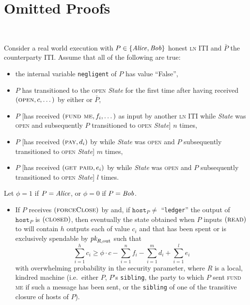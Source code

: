 \section{Omitted Proofs} \ \\
\label{sec:proofs}

\begin{lemma}
\label{lemma:real-balance-security}
  Consider a real world execution with $P \in \{\mathit{Alice}, \mathit{Bob}\}$ honest
  \textsc{ln} ITI and $\bar{P}$ the counterparty ITI. Assume that all of the
  following are true:
  \begin{itemize}
    \item the internal variable \texttt{negligent} of $P$ has value ``False'',
    \item $P$ has transitioned to the \textsc{open} \textit{State} for the first
    time after having received $(\textsc{open}, c, \dots)$ by either
    \environment or $\bar{P}$,
    \item $P$ [has received $(\textsc{fund me}, f_i, \dots)$ as input by another
    \textsc{ln} ITI while \textit{State} was \textsc{open} and subsequently $P$
    transitioned to \textsc{open} \textit{State}] $n$ times,
    \item $P$ [has received $(\textsc{pay}, d_i)$ by \environment while
    \textit{State} was \textsc{open} and $P$ subsequently transitioned to
    \textsc{open} \textit{State}] $m$ times,
    \item $P$ [has received $(\textsc{get paid}, e_i)$ by \environment while
    \textit{State} was \textsc{open} and $P$ subsequently transitioned to
    \textsc{open} \textit{State}] $l$ times.
  \end{itemize}
  Let $\phi = 1$ if $P = \mathit{Alice}$, or $\phi = 0$ if $P = \mathit{Bob}$.
  \begin{itemize}
    \item If $P$ receives $(\textsc{forceClose})$ by \environment and, if
    $\texttt{host}_P \neq$ ``\texttt{ledger}'' the output of $\texttt{host}_P$
    is $(\textsc{closed})$, then eventually the state obtained when $P$ inputs
    $(\textsc{read})$ to \ledger will contain $h$ outputs each of value $c_i$
    and that has been spent or is exclusively spendable by $\textit{pk}_{R,
    \mathrm{out}}$ such that
    \begin{equation}
    \label{lemma:real-balance-security:ineq}
      \sum\limits_{i=1}^h c_i \geq \phi \cdot c - \sum\limits_{i=1}^n f_i -
      \sum\limits_{i=1}^m d_i + \sum\limits_{i=1}^l e_i
    \end{equation}
    with overwhelming probability in the security parameter, where $R$ is a
    local, kindred machine (i.e.\ either $P$, $P$'s \texttt{sibling}, the party
    to which $P$ sent \textsc{fund me} if such a message has been sent, or the
    \texttt{sibling} of one of the transitive closure of hosts of $P$).
  \end{itemize}
\end{lemma}

